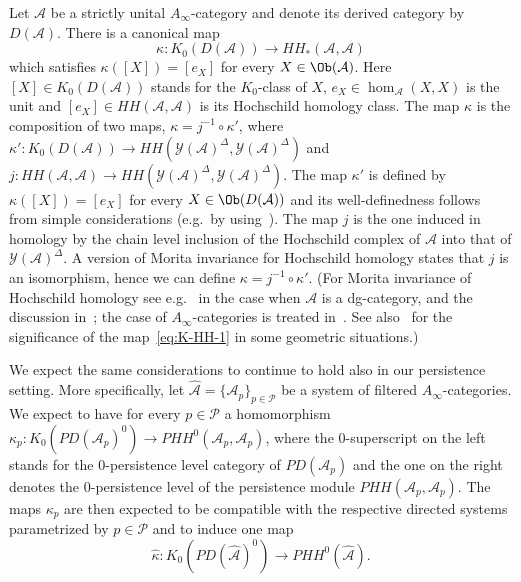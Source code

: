 \begin{rem} \label{r:K-HH} Let $\mathcal{A}$ be a strictly unital
  $A_{\infty}$-category and denote its derived category by
  $D(\mathcal{A})$. There is a canonical map
  \begin{equation} \label{eq:K-HH-1} \kappa: K_0(D(\mathcal{A}))
    \longrightarrow HH_*(\mathcal{A}, \mathcal{A})
  \end{equation}
  which satisfies $\kappa([X]) = [e_X]$ for every
  $X \in \Ob(\mathcal{A})$. Here $[X] \in K_0(D(\mathcal{A}))$ stands
  for the $K_0$-class of $X$, $e_X \in \hom_{\mathcal{A}}(X,X)$ is the
  unit and $[e_X] \in HH(\mathcal{A}, \mathcal{A})$ is its Hochschild
  homology class. The map $\kappa$ is the composition of two maps,
  $\kappa = j^{-1} \circ \kappa'$, where
  $\kappa' : K_0(D(\mathcal{A})) \longrightarrow
  HH(\mathcal{Y}(\mathcal{A})^{\Delta},
  \mathcal{Y}(\mathcal{A})^{\Delta})$ and
  $j: HH(\mathcal{A}, \mathcal{A}) \longrightarrow
  HH(\mathcal{Y}(\mathcal{A})^{\Delta},
  \mathcal{Y}(\mathcal{A})^{\Delta})$. The map $\kappa'$ is defined by
  $\kappa([X]) = [e_X]$ for every $X \in \Ob(D(\mathcal{A}))$ and its
  well-definedness follows from simple considerations (e.g.~by
  using~\cite[Proposition~3.8]{Se:book-fukaya-categ}). The map $j$ is
  the one induced in homology by the chain level inclusion of the
  Hochschild complex of $\mathcal{A}$ into that of
  $\mathcal{Y}(\mathcal{A})^{\Delta}$. A version of Morita invariance
  for Hochschild homology states that $j$ is an isomorphism, hence we
  can define $\kappa = j^{-1} \circ \kappa'$. (For Morita invariance
  of Hochschild homology see e.g.~\cite{To:dg-cat} in the case when
  $\mathcal{A}$ is a dg-category, and the discussion
  in~\cite[Section~5]{Se:homology-spheres}; the case of $A_{\infty}$-categories is treated in~\cite{Sher:form-hodge}. See
  also~\cite[Section~5.4]{Bi-Co:lefcob-pub} for the significance of
  the map~\eqref{eq:K-HH-1} in some geometric situations.)

  We expect the same considerations to continue to hold also in our
  persistence setting. More specifically, let
  $\widehat{\mathcal{A}} = \{\mathcal{A}_p\}_{p \in \mathcal{P}}$ be a
  system of filtered $A_{\infty}$-categories. We expect to have for
  every $p \in \mathcal{P}$ a homomorphism
  $\kappa_p : K_0(PD(\mathcal{A}_p)^0) \longrightarrow
  PHH^0(\mathcal{A}_p, \mathcal{A}_p)$, where the $0$-superscript on
  the left stands for the $0$-persistence level category of
  $PD(\mathcal{A}_p)$ and the one on the right denotes the
  $0$-persistence level of the persistence module
  $PHH(\mathcal{A}_p, \mathcal{A}_p)$. The maps $\kappa_p$ are then
  expected to be compatible with the respective directed systems
  parametrized by $p \in \mathcal{P}$ and to induce one map
  $$\widehat{\kappa}: K_0(PD(\widehat{\mathcal{A}})^0) \longrightarrow
  PHH^0(\widehat{\mathcal{A}}).$$
\end{rem}


